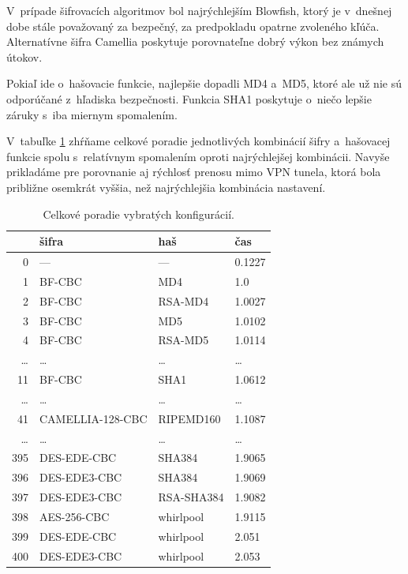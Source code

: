\documentclass[12pt,a4paper]{article}
\begin{document}
V~prípade šifrovacích algoritmov bol najrýchlejším Blowfish, ktorý je
v~dnešnej dobe stále považovaný za bezpečný, za predpokladu opatrne
zvoleného kľúča. Alternatívne šifra Camellia poskytuje porovnateľne dobrý
výkon bez známych útokov.

Pokiaľ ide o~hašovacie funkcie, najlepšie dopadli MD4 a~MD5, ktoré ale už
nie sú odporúčané z~hľadiska bezpečnosti. Funkcia SHA1 poskytuje o~niečo
lepšie záruky s~iba miernym spomalením.

V~tabuľke \ref{tbl:config-chart} zhŕňame celkové poradie jednotlivých
kombinácií šifry a~hašovacej funkcie spolu s~relatívnym spomalením oproti
najrýchlejšej kombinácii. Navyše prikladáme pre porovnanie aj rýchlosť
prenosu mimo VPN tunela, ktorá bola približne osemkrát vyššia, než
najrýchlejšia kombinácia nastavení.

\begin{table}\centering
    \caption{Celkové poradie vybratých konfigurácií.}
    \label{tbl:config-chart}
    \begin{tabular}{|r|l|l|l|}
        \hline
            \ & šifra & haš & čas \\ \hline
            0 & --- & --- & 0.1227 \\ \hline
            1 & BF-CBC & MD4 & 1.0 \\ \hline
            2 & BF-CBC & RSA-MD4 & 1.0027 \\ \hline
            3 & BF-CBC & MD5 & 1.0102 \\ \hline
            4 & BF-CBC & RSA-MD5 & 1.0114 \\ \hline
            \dots & \dots & \dots & \dots \\ \hline
            11 & BF-CBC & SHA1 & 1.0612 \\ \hline
            \dots & \dots & \dots & \dots \\ \hline
            41 & CAMELLIA-128-CBC & RIPEMD160 & 1.1087 \\ \hline
            \dots & \dots & \dots & \dots \\ \hline
            395 & DES-EDE-CBC & SHA384 & 1.9065 \\ \hline
            396 & DES-EDE3-CBC & SHA384 & 1.9069 \\ \hline
            397 & DES-EDE3-CBC & RSA-SHA384 & 1.9082 \\ \hline
            398 & AES-256-CBC & whirlpool & 1.9115 \\ \hline
            399 & DES-EDE-CBC & whirlpool & 2.051 \\ \hline
            400 & DES-EDE3-CBC & whirlpool & 2.053 \\ \hline
    \end{tabular}
\end{table}
\end{document}
